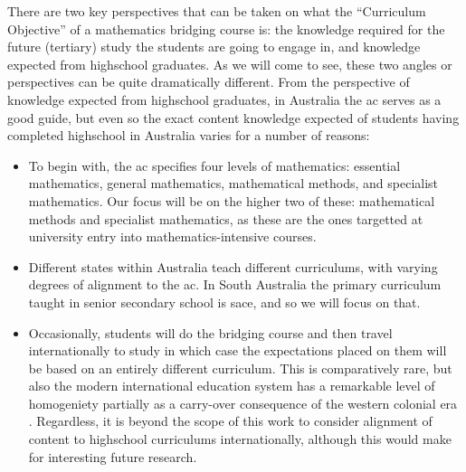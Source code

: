 \documentclass[twoside,12pt,a4paper]{report}
\begin{document}
There are two key perspectives that can be taken on what the ``Curriculum Objective'' of a mathematics bridging course is: the knowledge required for the future (tertiary) study the students are going to engage in, and knowledge expected from highschool graduates. As we will come to see, these two angles or perspectives can be quite dramatically different. From the perspective of knowledge expected from highschool graduates, in Australia the \gls{ac} serves as a good guide, but even so the exact content knowledge expected of students having completed highschool in Australia varies for a number of reasons:
\begin{itemize}
	\item To begin with, the \gls{ac} specifies four levels of mathematics: essential mathematics, general mathematics, mathematical methods, and specialist mathematics. Our focus will be on the higher two of these: mathematical methods and specialist mathematics, as these are the ones targetted at university entry into mathematics-intensive courses. 
	\item Different states within Australia teach different curriculums, with varying degrees of alignment to the \gls{ac}. In South Australia the primary curriculum taught in senior secondary school is \gls{sace}, and so we will focus on that.
	\item Occasionally, students will do the bridging course and then travel internationally to study in which case the expectations placed on them will be based on an entirely different curriculum. This is comparatively rare, but also the modern international education system has a remarkable level of homogeniety partially as a carry-over consequence of the western colonial era \cite{Mohandas2003}. Regardless, it is beyond the scope of this work to consider alignment of content to highschool curriculums internationally, although this would make for interesting future research.
\end{itemize}
\end{document}
